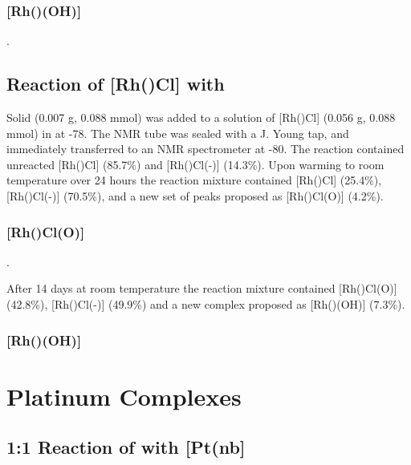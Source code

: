 \subsubsection{[Rh(\tButhixantphos)(OH)]}

.

\subsection*{Reaction of [Rh(\tBuxantphos)Cl] with \texorpdfstring{} O}

Solid  (0.007 g, 0.088 mmol) was added to a solution of [Rh(\tBuxantphos)Cl] (0.056 g, 0.088 mmol) in  at -78\degC{}.  The NMR tube was sealed with a J. Young tap, and immediately transferred to an NMR spectrometer at -80\degC.  The reaction contained unreacted [Rh(\tBuxantphos)Cl] (85.7\%) and [Rh(\tBuxantphos)Cl(-)] (14.3\%).  Upon warming to room temperature over 24 hours the reaction mixture contained [Rh(\tBuxantphos)Cl] (25.4\%), [Rh(\tBuxantphos)Cl(-)] (70.5\%), and a new set of peaks proposed as [Rh(\tBuxantphos)Cl(O)] (4.2\%).

\subsubsection{[Rh(\tBuxantphos)Cl(O)]}

.

After 14 days at room temperature the reaction mixture contained [Rh(\tBuxantphos)Cl(O)] (42.8\%), [Rh(\tBuxantphos)Cl(-)] (49.9\%) and a new complex proposed as [Rh(\tBuxantphos)(OH)] (7.3\%).

\subsubsection{[Rh(\tBuxantphos)(OH)]}


\section{Platinum Complexes}
\label{section:experimental:platinum}


\subsection*{1:1 Reaction of \Phthixantphos{} with [Pt(nb]}

